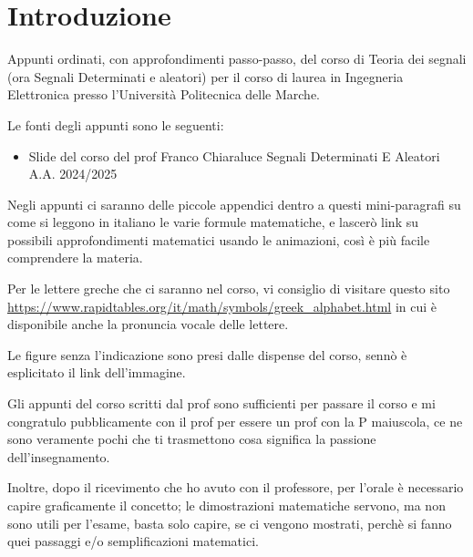 \section*{Introduzione}

 

Appunti ordinati, con approfondimenti passo-passo, del corso di Teoria dei segnali (ora Segnali Determinati e aleatori) per il corso di laurea in Ingegneria Elettronica 
presso l’Università Politecnica delle Marche. \newline
        



Le fonti degli appunti sono le seguenti: 

\begin{itemize}
    
    \item Slide del corso del prof Franco Chiaraluce Segnali Determinati E Aleatori A.A. 2024/2025
    

\end{itemize}

\begin{tcolorbox}
    Negli appunti ci saranno delle piccole appendici dentro a questi mini-paragrafi  
    su come si leggono in italiano le varie formule matematiche,  
    e lascerò link su possibili approfondimenti matematici usando le animazioni, 
    così è più facile comprendere la materia.
\end{tcolorbox}


Per le lettere greche che ci saranno nel corso, vi consiglio di visitare questo sito \\ 
\url{https://www.rapidtables.org/it/math/symbols/greek_alphabet.html} \break 
in cui è disponibile anche la pronuncia vocale delle lettere. \newline

Le figure senza l'indicazione sono presi dalle dispense del corso, 
sennò è esplicitato il link dell'immagine. \newline 

Gli appunti del corso scritti dal prof sono sufficienti per passare il corso e mi congratulo pubblicamente con il prof per essere un prof con la P maiuscola, ce ne sono veramente pochi 
che ti trasmettono cosa significa la passione dell'insegnamento.  \newline 

Inoltre, dopo il ricevimento che ho avuto con il professore, per l'orale è necessario capire graficamente il concetto; 
le dimostrazioni matematiche servono, ma non sono utili per l'esame, basta solo capire, se ci vengono mostrati, 
perchè si fanno quei passaggi e/o semplificazioni matematici. \newline 

